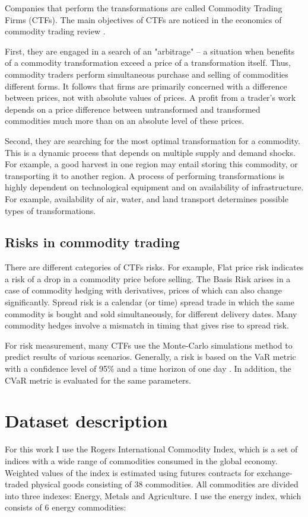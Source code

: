 \documentclass{article}
\begin{document}
Companies that perform the transformations are called Commodity Trading Firms (CTFs). The main objectives of CTFs are noticed in the economics of commodity trading review \cite{Pirrong}.

First, they are engaged in a search of an "arbitrage" -- a situation when benefits of a commodity transformation exceed a price of a transformation itself. Thus, commodity traders perform simultaneous purchase and selling of commodities different forms. It follows that firms are primarily concerned with a difference between prices, not with absolute values of prices. A profit from a trader's work depends on a price difference between untransformed and transformed commodities much more than on an absolute level of these prices.

Second, they are searching for the most optimal transformation for a commodity. This is a dynamic process that depends on multiple supply and demand shocks. For example, a good harvest in one region may entail storing this commodity, or transporting it to another region. A process of performing transformations is highly dependent on technological equipment and on availability of infrastructure. For example, availability of air, water, and land transport determines possible types of transformations.

\subsection{Risks in commodity trading}

There are different categories of CTFs risks. For example, Flat price risk indicates a risk of a drop in a commodity price before selling. The Basis Risk arises in a case of commodity hedging with derivatives, prices of which can also change significantly. Spread risk is a calendar (or time) spread trade in which the same commodity is bought and sold simultaneously, for different delivery dates. Many commodity hedges involve a mismatch in timing that gives rise to spread risk.

For risk measurement, many CTFs use the Monte-Carlo simulations method to predict results of various scenarios. Generally, a risk is based on the VaR metric with a confidence level of 95\% and a time horizon of one day \cite{Pirrong}. In addition, the CVaR metric is evaluated for the same parameters.

\section{Dataset description}
\label{section:dataset}
For this work I use the Rogers International Commodity Index, which is a set of indices with a wide range of commodities consumed in the global economy. Weighted values of the index is estimated using futures contracts for exchange-traded physical goods consisting of 38 commodities. All commodities are divided into three indexes: Energy, Metals and Agriculture. I use the energy \cite{RICI} index, which consists of 6 energy commodities:
\end{document}
